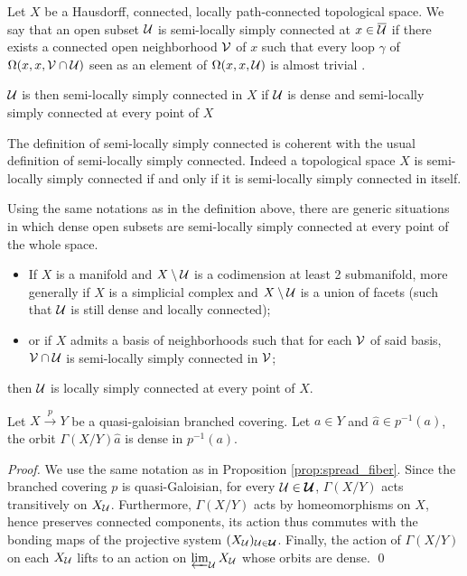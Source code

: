 \begin{defi}\label{def:semi_locally_simple_connectedness} Let $X$ be a Hausdorff, connected, locally path-connected topological space.  We say that an open subset $\mathcal{U}$ is semi-locally simply connected at $x \in \overline {\mathcal{U}}$ if there exists a connected open neighborhood $\mathcal V$ of $x$ such that every loop $\gamma$ of $\Omega(x,x,\mathcal V\cap \mathcal{U})$ seen as an element of $\Omega(x,x,\mathcal{U})$ is almost trivial . 

$\mathcal{U}$ is then semi-locally simply connected in $X$ if $\mathcal{U}$ is dense and semi-locally simply connected at every point of $X$
\end{defi}
\begin{rem}\label{rem:definition_semi_locally_simply_connected}
 The definition of semi-locally simply connected is coherent with the usual definition of semi-locally simply connected. Indeed a topological space $X$ is semi-locally simply connected if and only if it is semi-locally simply connected in  itself.
\end{rem}

\begin{rem} \label{rem:simple_cases} Using the same notations as in the definition above, there are generic situations in which dense open subsets are semi-locally simply connected at every point of the whole space.
\begin{itemize}
 \item If $X$ is a manifold and $X\setminus \mathcal{U}$ is a codimension at least 2 submanifold, more generally if $X$ is a simplicial complex and $X\setminus \mathcal{U}$ is a union of facets (such that $\mathcal{U}$ is still dense and locally connected);
 \item  or if $X$ admits a basis of neighborhoods such that for each $\mathcal V$ of said basis, $\mathcal V\cap \mathcal{U}$ is semi-locally simply connected in $\mathcal V$;
\end{itemize}
then $\mathcal{U}$ is locally simply connected at every point of $X$. 
\end{rem}



\begin{lem}\label{lem:dense_orbits}
 Let $X\xrightarrow{p} Y$ be a quasi-galoisian branched covering. Let $a\in Y$ and $\hat a \in p^{-1}(a)$, the orbit  $\Gamma(X/Y)\hat a$  is dense in $p^{-1}(a)$.
\end{lem}
\begin{proof} We use the same notation as in Proposition \ref{prop:spread_fiber}. 
  Since the branched covering $p$ is quasi-Galoisian, for every $\mathcal{U}\in \boldsymbol{\mathcal{U}}$, $\Gamma(X/Y)$ acts transitively on $X_{\mathcal{U}}$. Furthermore, $\Gamma(X/Y)$ acts by homeomorphisms on $X$, hence preserves connected components, its action thus commutes with the bonding maps of the projective system $(X_{\mathcal{U}})_{\mathcal{U}\in \boldsymbol{\mathcal{U}}}$. Finally, the action of $\Gamma(X/Y)$ on each $X_{\mathcal{U}}$ lifts to an action on $\varprojlim_{\mathcal{U}} X_{\mathcal{U}}$ whose orbits are dense.
\qed\end{proof}



